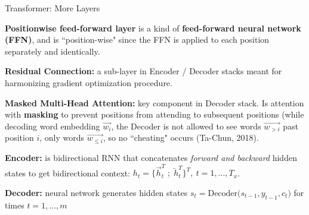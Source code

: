 \begin{frame}{Transformer: More Layers}

    \begin{itemizeSpaced}{3pt}
        \item \textbf{Positionwise feed-forward layer} is a kind of \textbf{feed-forward neural network (FFN)}, and is ``position-wise" since the FFN is applied to each position separately and identically.
        
        \item \textbf{Residual Connection: }a sub-layer in Encoder / Decoder stacks meant for harmonizing gradient optimization procedure.
        
        \item \textbf{Masked Multi-Head Attention: } key component in Decoder stack. Is attention with \textbf{masking} to prevent positions from attending to subsequent positions (while decoding word embedding $\overrightarrow{w_i}$, the Decoder is not allowed to see words  $\overrightarrow{w_{>i}}$ past position $i$, only words $\overrightarrow{w_{\leq i}}$, so no ``cheating" occurs (Ta-Chun, 2018). 
        
        \item \textbf{Encoder: } is bidirectional RNN that concatenates \emph{forward and backward} hidden states to get bidirectional context: $h_t = \Big \{ \overrightarrow{h}_t^T \; ; \; \overleftarrow{h}_t^T \Big\}^T , \: t=1,...,T_x$. \footnotemark 
        
        \item \textbf{Decoder: } neural network generates hidden states $s_t = \text{Decoder}\Big( s_{t-1}, y_{t-1}, c_t \Big)$ for times $t = 1,..., m$ \footnotemark  
        
    \end{itemizeSpaced}
    
    
    
    
    
\end{frame}


